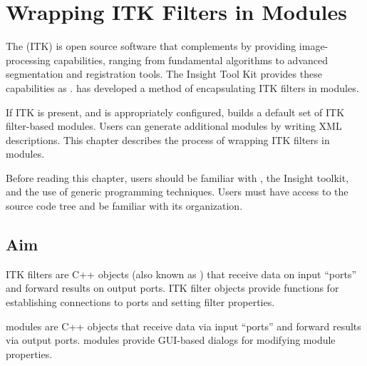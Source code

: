 %
%
%
%
%


\chapter{Wrapping  ITK Filters in \sr{} Modules}
\label{ch:itk_mods}

The  (ITK)
is open source software that complements \sr{} by providing
image-processing capabilities, ranging from fundamental algorithms to
advanced segmentation and registration tools.  The Insight Tool Kit
provides these capabilities as .  \sci{} has developed a
method of encapsulating ITK filters in \sr{} modules.

If ITK is present, and \sr{} is appropriately configured, \sr{} 
builds a default set of ITK filter-based modules.  Users can generate 
additional modules by writing XML descriptions. This chapter describes
the process of wrapping ITK filters in \sr{} modules.

Before reading this chapter, users should be familiar with \sr{}, the
Insight toolkit, and the use of generic programming techniques.  Users
must have access to the \sr{} source code tree and be familiar with
its organization.


\section{Aim}
\label{sec:itk_mods:aim}

ITK filters are C++ objects (also known as ) that
receive data on input ``ports'' and forward results on output ports.
ITK filter objects provide functions for establishing connections to
ports and setting filter properties.

\sr{} modules are C++ objects that receive data via input ``ports''
and forward results via output ports.  \sr{} modules provide
GUI-based dialogs for modifying  module properties.

